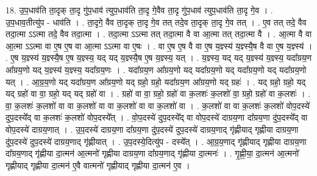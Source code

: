 \documentclass[17pt]{extarticle}
\begin{document}
18. उ॒प॒धाव॑ति ता॒दृक् ता॒दृ गु॑प॒धाव॑ त्युप॒धाव॑ति ता॒दृ गे॒वैव ता॒दृ गु॑प॒धाव॑ त्युप॒धाव॑ति ता॒दृ गे॒व । . उ॒प॒धाव॒तीत्यु॑प - धाव॑ति । . ता॒दृगे॒ वैव ता॒दृक् ता॒दृ गे॒व तत् तदे॒व ता॒दृक् ता॒दृ गे॒व तत् । . ए॒व तत् तदे॒ वैव तदा॒त्मा ऽऽत्मा तदे॒ वैव तदा॒त्मा । . तदा॒त्मा ऽऽत्मा तत् तदा॒त्मा वै वा आ॒त्मा तत् तदा॒त्मा वै । . आ॒त्मा वै वा आ॒त्मा ऽऽत्मा वा ए॒ष ए॒ष वा आ॒त्मा ऽऽत्मा वा ए॒षः । . वा ए॒ष ए॒ष वै वा ए॒ष य॒ज्ञ्स्य॑ य॒ज्ञ्स्यै॒ष वै वा ए॒ष य॒ज्ञ्स्य॑ । . ए॒ष य॒ज्ञ्स्य॑ य॒ज्ञ्स्यै॒ष ए॒ष य॒ज्ञ्स्य॒ यद् यद् य॒ज्ञ्स्यै॒ष ए॒ष य॒ज्ञ्स्य॒ यत् । . य॒ज्ञ्स्य॒ यद् यद् य॒ज्ञ्स्य॑ य॒ज्ञ्स्य॒ यदा᳚ग्रय॒ण आ᳚ग्रय॒णो यद् य॒ज्ञ्स्य॑ य॒ज्ञ्स्य॒ यदा᳚ग्रय॒णः । . यदा᳚ग्रय॒ण आ᳚ग्रय॒णो यद् यदा᳚ग्रय॒णो यद् यदा᳚ग्रय॒णो यद् यदा᳚ग्रय॒णो यत् । . आ॒ग्र॒य॒णो यद् यदा᳚ग्रय॒ण आ᳚ग्रय॒णो यद् ग्रहो॒ ग्रहो॒ यदा᳚ग्रय॒ण आ᳚ग्रय॒णो यद् ग्रहः॑ । . यद् ग्रहो॒ ग्रहो॒ यद् यद् ग्रहो॑ वा वा॒ ग्रहो॒ यद् यद् ग्रहो॑ वा । . ग्रहो॑ वा वा॒ ग्रहो॒ ग्रहो॑ वा क॒लशः॑ क॒लशो॑ वा॒ ग्रहो॒ ग्रहो॑ वा क॒लशः॑ । . वा॒ क॒लशः॑ क॒लशो॑ वा वा क॒लशो॑ वा वा क॒लशो॑ वा वा क॒लशो॑ वा । . क॒लशो॑ वा वा क॒लशः॑ क॒लशो॑ वोप॒दस्ये॑ दुप॒दस्ये᳚द् वा क॒लशः॑ क॒लशो॑ वोप॒दस्ये᳚त् । . वो॒प॒दस्ये॑ दुप॒दस्ये᳚द् वा वोप॒दस्ये॑ दाग्रय॒णा दा᳚ग्रय॒णा दु॑प॒दस्ये᳚द् वा वोप॒दस्ये॑ दाग्रय॒णात् । . उ॒प॒दस्ये॑ दाग्रय॒णा दा᳚ग्रय॒णा दु॑प॒दस्ये॑ दुप॒दस्ये॑ दाग्रय॒णाद् गृ॑ह्णीयाद् गृह्णीया दाग्रय॒णा दु॑प॒दस्ये॑ दुप॒दस्ये॑ दाग्रय॒णाद् गृ॑ह्णीयात् । . उ॒प॒दस्ये॒दित्यु॑प - दस्ये᳚त् । . आ॒ग्र॒य॒णाद् गृ॑ह्णीयाद् गृह्णीया दाग्रय॒णा दा᳚ग्रय॒णाद् गृ॑ह्णीया दा॒त्मन॑ आ॒त्मनो॑ गृह्णीया दाग्रय॒णा दा᳚ग्रय॒णाद् गृ॑ह्णीया दा॒त्मनः॑ । . गृ॒ह्णी॒या॒ दा॒त्मन॑ आ॒त्मनो॑ गृह्णीयाद् गृह्णीया दा॒त्मन॑ ए॒वै वात्मनो॑ गृह्णीयाद् गृह्णीया दा॒त्मन॑ ए॒व । \newline
\end{document}
